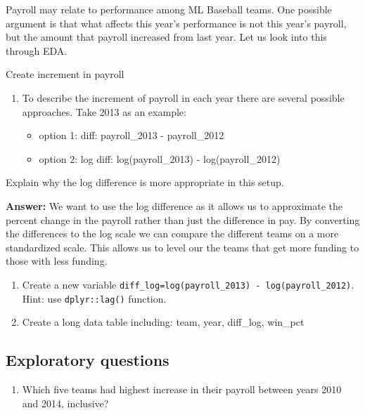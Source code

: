 \documentclass[
]{article}
\providecommand{\tightlist}{%
  \setlength{\itemsep}{0pt}\setlength{\parskip}{0pt}}
\begin{document}
Payroll may relate to performance among ML Baseball teams. One possible
argument is that what affects this year's performance is not this year's
payroll, but the amount that payroll increased from last year. Let us
look into this through EDA.

Create increment in payroll

\begin{enumerate}
\def\labelenumi{\roman{enumi}.}
\item
  To describe the increment of payroll in each year there are several
  possible approaches. Take 2013 as an example:

  \begin{itemize}
  \tightlist
  \item
    option 1: diff: payroll\_2013 - payroll\_2012
  \item
    option 2: log diff: log(payroll\_2013) - log(payroll\_2012)
  \end{itemize}
\end{enumerate}

Explain why the log difference is more appropriate in this setup.

\textbf{Answer:} We want to use the log difference as it allows us to
approximate the percent change in the payroll rather than just the
difference in pay. By converting the differences to the log scale we can
compare the different teams on a more standardized scale. This allows us
to level our the teams that get more funding to those with less funding.

\begin{enumerate}
\def\labelenumi{\roman{enumi}.}
\setcounter{enumi}{1}
\item
  Create a new variable
  \texttt{diff\_log=log(payroll\_2013)\ -\ log(payroll\_2012)}. Hint:
  use \texttt{dplyr::lag()} function.
\item
  Create a long data table including: team, year, diff\_log, win\_pct
\end{enumerate}

\hypertarget{exploratory-questions}{%
\subsection{Exploratory questions}\label{exploratory-questions}}

\begin{enumerate}
\def\labelenumi{\roman{enumi}.}
\tightlist
\item
  Which five teams had highest increase in their payroll between years
  2010 and 2014, inclusive?
\end{enumerate}
\end{document}
